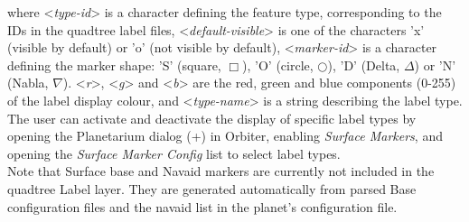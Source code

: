 \documentclass[Orbiter Developer Manual.tex]{subfiles}
\begin{document}
\noindent
where <\textit{type-id}> is a character defining the feature type, corresponding to the IDs in the quadtree label files, <\textit{default-visible}> is one of the characters 'x' (visible by default) or 'o' (not visible by default), <\textit{marker-id}> is a character defining the marker shape: 'S' (square, $\Box$), 'O' (circle, $\bigcirc$), 'D' (Delta, $\Delta$) or 'N' (Nabla, $\nabla$). <\textit{r}>, <\textit{g}> and <\textit{b}> are the red, green and blue components (0-255) of the label display colour, and <\textit{type-name}> is a string describing the label type.\\
The user can activate and deactivate the display of specific label types by opening the Planetarium dialog (\Ctrl+) in Orbiter, enabling \textit{Surface Markers}, and opening the \textit{Surface Marker Config} list to select label types.\\
Note that Surface base and Navaid markers are currently not included in the quadtree Label layer. They are generated automatically from parsed Base configuration files and the navaid list in the planet's configuration file.
\end{document}
